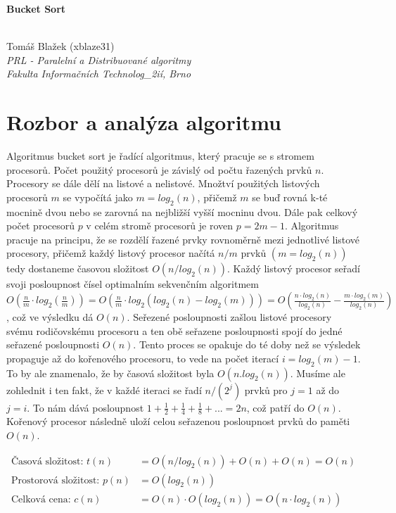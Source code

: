 \documentclass[12pt, a4paper]{article}
\begin{document}
\begin{center}
	\begin{huge}\textbf{Bucket Sort}\end{huge} \\
	\vspace{0.4cm}
	Tomáš Blažek (xblaze31) \\
	\textit{PRL - Paralelní a Distribuované algoritmy} \\
	\textit{Fakulta Informačních Technolog_{2}ií, Brno} \\
\end{center}



\section{Rozbor a analýza algoritmu}
\label{sec:rozbor}
Algoritmus bucket sort je řadící algoritmus, který pracuje se s stromem procesorů. Počet použitý procesorů je závislý od počtu řazených prvků $n$. Procesory se dále dělí na listové a nelistové. Množtví použitých listových procesorů $m$ se vypočítá jako $m=log_{2}(n)$, přičemž $m$ se buď rovná k-té mocnině dvou nebo se zarovná na nejbližší vyšší mocninu dvou. Dále pak celkový počet procesorů $p$ v celém stromě procesorů je roven $p = 2m-1$. Algoritmus pracuje na principu, že se rozdělí řazené prvky rovnoměrně mezi jednotlivé listové procesory, přičemž každý listový procesor načítá $n/m$ prvků $(m=log_{2}(n))$ tedy dostaneme časovou složitost $O(n/log_{2}(n))$. Každý listový procesor seřadí svoji posloupnost čísel optimalním sekvenčním algoritmem $O(\frac{n}{m}\cdot log_{2}(\frac{n}{m})) = O(\frac{n}{m}\cdot log_{2}(log_{2}(n)-log_{2}(m))) = O(\frac{n\cdot log_{2}(n)}{log_{2}(n)}-\frac{m\cdot log_{2}(m)}{log_{2}(n)})$, což ve výsledku dá $O(n)$. Seřezené posloupnosti zašlou listové procesory svému rodičovskému procesoru a ten obě seřazene posloupnosti spojí do jedné seřazené posloupnosti $O(n)$. Tento proces se opakuje do té doby než se výsledek propaguje až do kořenového procesoru, to vede na počet iterací  $i = log_{2}(m)-1$. To by ale znamenalo, že by časová složitost byla $O(n.log_{2}(n))$. Musíme ale zohlednit i ten fakt, že v každé iteraci se řadí $n/(2^j)$ prvků pro $j = 1$ až do $j = i$. To nám dává posloupnost $1 + \frac{1}{2} + \frac{1}{4} +\frac{1}{8} + ... = 2n$, což patří do $O(n)$. Kořenový procesor následně uloží celou seřazenou posloupnost prvků do paměti $O(n)$. 


\begin{equation}
\begin{split}
\text{Časová složitost: }t(n) &= O(n/log_{2}(n)) + O(n) + O(n) = O(n)\\
\text{Prostorová složitost: }p(n) &= O(log_{2}(n))\\
\text{Celková cena: }c(n) &= O(n) \cdot O(log_{2}(n)) = O(n\cdot log_{2}(n))
\end{split}
\end{equation}
\end{document}

